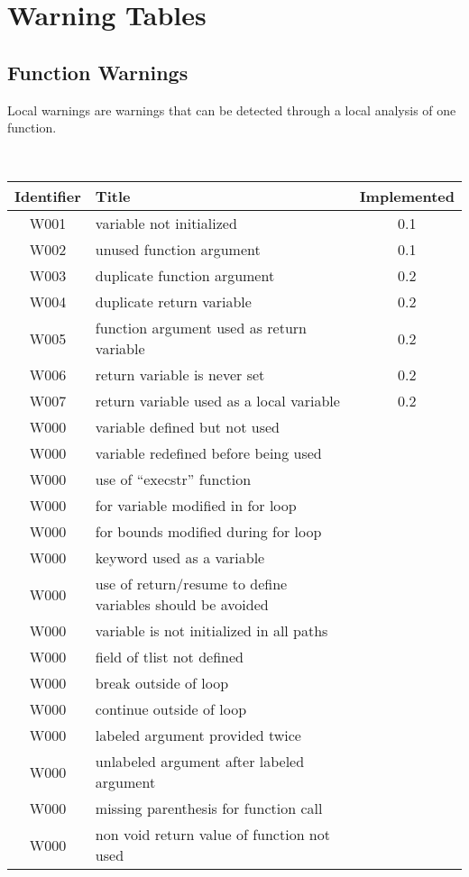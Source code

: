 \section{Warning Tables}

\subsection{Function Warnings}



Local warnings are warnings that can be detected through a local analysis of
one function.



\noindent\\\begin{tabular}{|c|p{8cm}|c|} \hline
Identifier & Title & Implemented      \\ \hline
W001 & variable not initialized & 0.1 \\ \hline
W002 & unused function argument & 0.1 \\ \hline
W003 & duplicate function argument & 0.2 \\ \hline
W004 & duplicate return variable   & 0.2 \\ \hline
W005 & function argument used as return variable   & 0.2 \\ \hline
W006 & return variable is never set & 0.2 \\ \hline
W007 & return variable used as a local variable & 0.2 \\ \hline
W000 & variable defined but not used &  \\ \hline
W000 & variable redefined before being used &  \\ \hline
W000 & use of ``execstr'' function      &  \\ \hline
W000 & for variable modified in for loop &  \\ \hline
W000 & for bounds modified during for loop &  \\ \hline
W000 & keyword used as a variable &  \\ \hline
W000 & use of return/resume to define variables should be avoided &  \\ \hline
W000 & variable is not initialized in all paths &  \\ \hline
W000 & field of tlist not defined &  \\ \hline
W000 & break outside of loop &  \\ \hline
W000 & continue outside of loop &  \\ \hline
W000 & labeled argument provided twice &  \\ \hline
W000 & unlabeled argument after labeled argument &  \\ \hline
W000 & missing parenthesis for function call &  \\ \hline
W000 & non void return value of function not used &  \\ \hline
\end{tabular}

